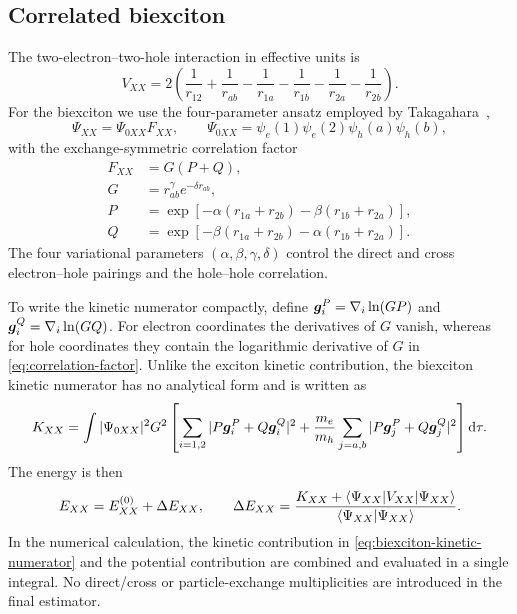 \subsection{Correlated biexciton}
\label{sec:biexciton-model}

The two-electron--two-hole interaction in effective units is
\begin{equation}
 V_{XX}=2\left(
 \frac{1}{r_{12}}+\frac{1}{r_{ab}}
 -\frac{1}{r_{1a}}-\frac{1}{r_{1b}}
 -\frac{1}{r_{2a}}-\frac{1}{r_{2b}}
 \right).
 \label{eq:biexciton-coulomb}
\end{equation}
For the biexciton we use the four-parameter ansatz employed by
Takagahara~\cite{takagahara1989},
\begin{equation}
 \Psi_{XX}=\Psi_{0XX}F_{XX},\qquad
 \Psi_{0XX}=\psi_e(1)\psi_e(2)\psi_h(a)\psi_h(b),
 \label{eq:biexciton-trial}
\end{equation}
with the exchange-symmetric correlation factor
\begin{equation}
\begin{aligned}
 F_{XX}&=G(P+Q),\\
 G&=r_{ab}^{\gamma}e^{-\delta r_{ab}},\\
 P&=\exp\left[-\alpha(r_{1a}+r_{2b})
                 -\beta(r_{1b}+r_{2a})\right],\\
 Q&=\exp\left[-\beta(r_{1a}+r_{2b})
                 -\alpha(r_{1b}+r_{2a})\right].
\end{aligned}
 \label{eq:correlation-factor}
\end{equation}
The four variational parameters $(\alpha,\beta,\gamma,\delta)$ control the
direct and cross electron--hole pairings and the hole--hole correlation.

To write the kinetic numerator compactly, define
$\bm{g}_i^P=\nabla_i\ln(GP)$ and
$\bm{g}_i^Q=\nabla_i\ln(GQ)$. For electron coordinates the derivatives of
$G$ vanish, whereas for hole coordinates they contain the logarithmic
derivative of $G$ in \cref{eq:correlation-factor}. Unlike the exciton kinetic contribution,
the biexciton kinetic numerator has no analytical form and is written as
\begin{equation}
 K_{XX}=\int|\Psi_{0XX}|^2G^2\left[\sum_{i=1,2}|P\bm{g}_i^P+Q\bm{g}_i^Q|^2+\frac{m_e}{m_h}\sum_{j=a,b}|P\bm{g}_j^P+Q\bm{g}_j^Q|^2\right]\mathop{}\!\mathrm{d}\tau .
 \label{eq:biexciton-kinetic-numerator}
\end{equation}
The energy is then
\begin{equation}
 E_{XX}=E_{XX}^{(0)}+\Delta E_{XX},\qquad
 \Delta E_{XX}=
 \frac{K_{XX}+\langle\Psi_{XX}|V_{XX}|\Psi_{XX}\rangle}
 {\langle\Psi_{XX}|\Psi_{XX}\rangle}.
 \label{eq:biexciton-energy}
\end{equation}
In the numerical calculation, the kinetic contribution in
\cref{eq:biexciton-kinetic-numerator} and the potential contribution are
combined and evaluated in a single integral. No direct/cross or
particle-exchange multiplicities are introduced in the final estimator.


